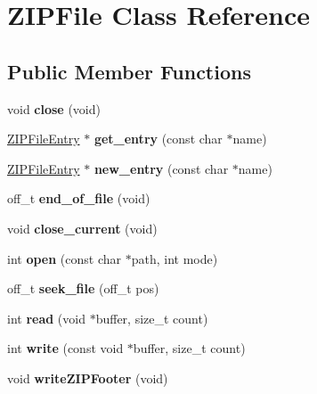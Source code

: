 \hypertarget{classZIPFile}{\section{Z\-I\-P\-File Class Reference}
\label{classZIPFile}
}
\subsection*{Public Member Functions}
\begin{DoxyCompactItemize}
\item 
\hypertarget{classZIPFile_a5dab97f1925d0430fd755d3108dd9775}{void {\bfseries close} (void)}\label{classZIPFile_a5dab97f1925d0430fd755d3108dd9775}

\item 
\hypertarget{classZIPFile_aee2fb355b52c3f18fd07f09cd1d5d37b}{\hyperlink{classZIPFileEntry}{Z\-I\-P\-File\-Entry} $\ast$ {\bfseries get\-\_\-entry} (const char $\ast$name)}\label{classZIPFile_aee2fb355b52c3f18fd07f09cd1d5d37b}

\item 
\hypertarget{classZIPFile_adec5779281e89ca57cd0bace3b6c72ec}{\hyperlink{classZIPFileEntry}{Z\-I\-P\-File\-Entry} $\ast$ {\bfseries new\-\_\-entry} (const char $\ast$name)}\label{classZIPFile_adec5779281e89ca57cd0bace3b6c72ec}

\item 
\hypertarget{classZIPFile_a78174bf80e9d5e4dbccb4c43a50f449e}{off\-\_\-t {\bfseries end\-\_\-of\-\_\-file} (void)}\label{classZIPFile_a78174bf80e9d5e4dbccb4c43a50f449e}

\item 
\hypertarget{classZIPFile_a4d68407ce80cfbeca880891c32590329}{void {\bfseries close\-\_\-current} (void)}\label{classZIPFile_a4d68407ce80cfbeca880891c32590329}

\item 
\hypertarget{classZIPFile_ad84b8424f7f346fcc3c43ce74b2fca1d}{int {\bfseries open} (const char $\ast$path, int mode)}\label{classZIPFile_ad84b8424f7f346fcc3c43ce74b2fca1d}

\item 
\hypertarget{classZIPFile_a50c6828eef0bca1e58a8fbb82b340dbc}{off\-\_\-t {\bfseries seek\-\_\-file} (off\-\_\-t pos)}\label{classZIPFile_a50c6828eef0bca1e58a8fbb82b340dbc}

\item 
\hypertarget{classZIPFile_a2ddcf108292da6ee711d4ee2c3483255}{int {\bfseries read} (void $\ast$buffer, size\-\_\-t count)}\label{classZIPFile_a2ddcf108292da6ee711d4ee2c3483255}

\item 
\hypertarget{classZIPFile_a2295b9685002b73131cc798a9ab9c8dd}{int {\bfseries write} (const void $\ast$buffer, size\-\_\-t count)}\label{classZIPFile_a2295b9685002b73131cc798a9ab9c8dd}

\item 
\hypertarget{classZIPFile_a042b249163cd49163aa9ba9e672c836a}{void {\bfseries write\-Z\-I\-P\-Footer} (void)}\label{classZIPFile_a042b249163cd49163aa9ba9e672c836a}

\end{DoxyCompactItemize}

